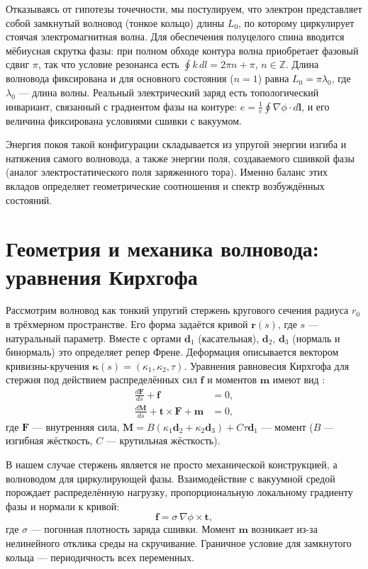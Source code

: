 \documentclass[12pt,a4paper]{article}
\begin{document}
	Отказываясь от гипотезы точечности, мы постулируем, что электрон представляет собой замкнутый волновод (тонкое кольцо) длины $L_0$, по которому циркулирует стоячая электромагнитная волна. Для обеспечения полуцелого спина вводится мёбиусная скрутка фазы: при полном обходе контура волна приобретает фазовый сдвиг $\pi$, так что условие резонанса есть $\oint k\,dl = 2\pi n + \pi$, $n\in\mathbb{Z}$. Длина волновода фиксирована и для основного состояния ($n=1$) равна $L_0 = \pi\lambda_0$, где $\lambda_0$ — длина волны. Реальный электрический заряд есть топологический инвариант, связанный с градиентом фазы на контуре: $e = \frac{1}{c}\oint \nabla\phi\cdot d\mathbf{l}$, и его величина фиксирована условиями сшивки с вакуумом.
	
	Энергия покоя такой конфигурации складывается из упругой энергии изгиба и натяжения самого волновода, а также энергии поля, создаваемого сшивкой фазы (аналог электростатического поля заряженного тора). Именно баланс этих вкладов определяет геометрические соотношения и спектр возбуждённых состояний.
	
	\section{Геометрия и механика волновода: уравнения Кирхгофа}
	Рассмотрим волновод как тонкий упругий стержень кругового сечения радиуса $r_0$ в трёхмерном пространстве. Его форма задаётся кривой $\mathbf{r}(s)$, где $s$ — натуральный параметр. Вместе с ортами $\mathbf{d}_1$ (касательная), $\mathbf{d}_2$, $\mathbf{d}_3$ (нормаль и бинормаль) это определяет репер Френе. Деформация описывается вектором кривизны-кручения $\boldsymbol{\kappa}(s) = (\kappa_1,\kappa_2,\tau)$. Уравнения равновесия Кирхгофа для стержня под действием распределённых сил $\mathbf{f}$ и моментов $\mathbf{m}$ имеют вид \cite{Kirchhoff}:
	\begin{align}
		\frac{d\mathbf{F}}{ds} + \mathbf{f} &= 0, \label{eq:Kirchhoff1}\\
		\frac{d\mathbf{M}}{ds} + \mathbf{t}\times \mathbf{F} + \mathbf{m} &= 0, \label{eq:Kirchhoff2}
	\end{align}
	где $\mathbf{F}$ — внутренняя сила, $\mathbf{M} = B(\kappa_1\mathbf{d}_2 + \kappa_2\mathbf{d}_3) + C\tau\mathbf{d}_1$ — момент ($B$ — изгибная жёсткость, $C$ — крутильная жёсткость).
	
	В нашем случае стержень является не просто механической конструкцией, а волноводом для циркулирующей фазы. Взаимодействие с вакуумной средой порождает распределённую нагрузку, пропорциональную локальному градиенту фазы и нормали к кривой:
	\begin{equation}
		\mathbf{f} = \sigma\, \nabla\phi \times \mathbf{t},
	\end{equation}
	где $\sigma$ — погонная плотность заряда сшивки. Момент $\mathbf{m}$ возникает из-за нелинейного отклика среды на скручивание. Граничное условие для замкнутого кольца — периодичность всех переменных.
	
\end{document}
